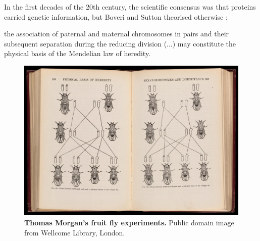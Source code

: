 


In the first decades of the 20th century, the scientific consensus was that proteins carried genetic information, but Boveri and Sutton theorised otherwise \cite{dahm:2005wx,sutton:1902tx}:

\begin{displayquote}
the association of paternal and maternal chromosomes in pairs and their subsequent separation during the reducing division (...) may constitute the physical basis of the Mendelian law of heredity.
\end{displayquote}


\begin{figure}
  \vspace{-\intextsep}
  \includegraphics[width=\linewidth]{images/intro/thomas-morgan-fly}
  \caption[Thomas Morgan's fruit fly experiments]{\textbf{Thomas Morgan's fruit fly experiments.} Public domain image from Wellcome Library, London.}

\end{figure}

